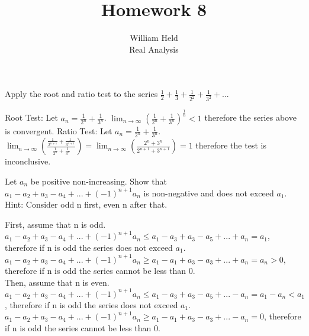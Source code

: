\documentclass[12pt]{article}
\newenvironment{exercise}[2][Exercise]{\begin{trivlist}
\item[\hskip \labelsep {\bfseries #1}\hskip \labelsep {\bfseries #2.}]}{\end{trivlist}}
\begin{document}
 
 
 
\title{Homework 8}%
\author{William Held\\ %
Real Analysis} %

\newcommand{\norm}[1]{\left\lVert#1\right\rVert}
\newcommand{\abs}[1]{|#1|}
\newcommand{\ceil}[1]{\left \lceil #1 \right \rceil }
\newcommand{\floor}[1]{\left \lfloor #1 \right \rfloor }
\let\biconditional\leftrightarrow
\maketitle

\begin{exercise}{1.1}
Apply the root and ratio test to the series $\frac{1}{2}+\frac{1}{3}+\frac{1}{2^2}+\frac{1}{3^2}+$...
\end{exercise}
Root Test: Let $a_n=\frac{1}{2^n}+\frac{1}{3^n}$. $\displaystyle{\lim_{n \to \infty}(\frac{1}{2^n}+\frac{1}{3^n})^\frac{1}{n}} < 1$ therefore the series above is convergent.
Ratio Test: Let $a_n=\frac{1}{2^n}+\frac{1}{3^n}$. $\displaystyle{\lim_{n \to \infty}(\frac{\frac{1}{2^{n+1}}+\frac{1}{3^{n+1}}}{\frac{1}{2^n}+\frac{1}{3^n}})=\lim_{n \to \infty}(\frac{2^n+3^n}{2^{n+1}+3^{n+1}}) = 1}$ therefore the test is inconclusive.
\begin{exercise}{1.2}
Let $a_n$ be positive non-increasing. Show that $a_1-a_2+a_3-a_4+...+(-1)^{n+1}a_n$ is non-negative and does not exceed $a_1$. Hint: Consider odd n first, even n after that.
\end{exercise}
First, assume that n is odd.
$a_1-a_2+a_3-a_4+...+(-1)^{n+1}a_n \leq a_1-a_3+a_3-a_5+...+a_n = a_1$, therefore if n is odd the series does not exceed $a_1$. 
$a_1-a_2+a_3-a_4+...+(-1)^{n+1}a_n \geq a_1-a_1+a_3-a_3+...+a_n = a_n > 0$, therefore if n is odd the series cannot be less than 0.
\vspace{12pt} \\
Then, assume that n is even.
$a_1-a_2+a_3-a_4+...+(-1)^{n+1}a_n \leq a_1-a_3+a_3-a_5+...-a_n = a_1-a_n < a_1$, therefore if n is odd the series does not exceed $a_1$. 
$a_1-a_2+a_3-a_4+...+(-1)^{n+1}a_n \geq a_1-a_1+a_3-a_3+...-a_n = 0$, therefore if n is odd the series cannot be less than 0.
\end{document}
